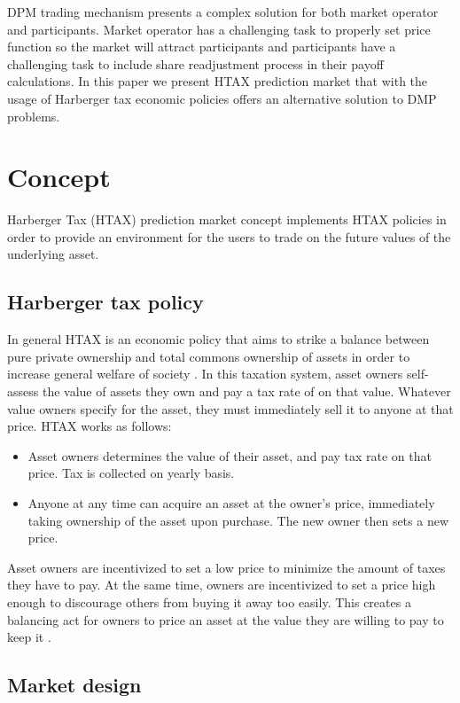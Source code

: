 \documentclass{article}
\begin{document}
	DPM trading mechanism presents a complex solution for both market operator and participants. Market operator has a challenging task to properly set price function so the market will attract participants and participants have a challenging task to include share readjustment process in their payoff calculations. In this paper we present HTAX prediction market that with the usage of Harberger tax economic policies offers an alternative solution to DMP problems.
	
	
	\section{Concept}
	
	Harberger Tax (HTAX) prediction market concept implements HTAX policies in order to provide an environment for the users to trade on the future values of the underlying asset. 
	
	
	\subsection{Harberger tax policy}
	
	In general HTAX is an economic policy that aims to strike a balance between pure private ownership and total commons ownership of assets in order to increase general welfare of society \cite{Posner}. In this taxation system, asset owners self-assess the value of assets they own and pay a tax rate of on that value. Whatever value owners specify for the asset, they must immediately sell it to anyone at that price. HTAX works as follows:
	\begin{itemize}
		\item Asset owners determines the value of their asset, and pay tax rate on that price. Tax is collected on yearly basis.
		\item Anyone at any time can acquire an asset at the owner’s price, immediately taking ownership of the asset upon purchase. The new owner then sets a new price.
	\end{itemize}
	
	Asset owners are incentivized to set a low price to minimize the amount of taxes they have to pay. At the same time, owners are incentivized to set a price high enough to discourage others from buying it away too easily. This creates a balancing act for owners to price an asset at the value they are willing to pay to keep it \cite{Riady}.
	
	\subsection{Market design}
	
\end{document}
